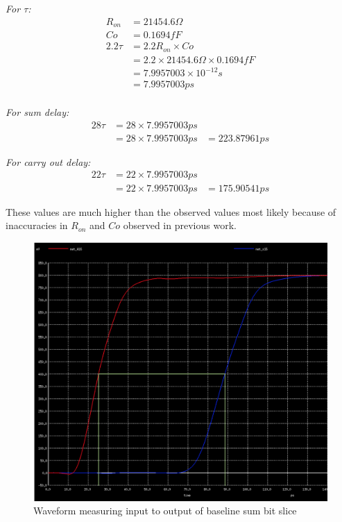 \documentclass{article}
\begin{document}
\textit{For $\tau$:}\\
\begin{align*}
R_{on} &= 21454.6\Omega\\
Co &= 0.1694fF\\
2.2 \tau &= 2.2 R_{on} \times Co\\
&= 2.2 \times 21454.6\Omega \times 0.1694fF \\
&= 7.9957003\times 10^{-12}s\\
&= 7.9957003ps\\
\end{align*}

\textit{For sum delay:}\\
\begin{align*}
28\tau &= 28 \times 7.9957003ps\\
&= 28 \times 7.9957003ps
&= 223.87961ps
\end{align*}

\textit{For carry out delay:}\\
\begin{align*}
22\tau &= 22 \times 7.9957003ps\\
&= 22 \times 7.9957003ps
&= 175.90541ps
\end{align*}

These values are much higher than the observed values most likely because of inaccuracies in $R_{on}$ and $Co$ observed in previous work. 

\begin{figure}[H]
  \includegraphics[width=\linewidth]{baseline_screenshots/sum_out_waveform.png}
  \caption{Waveform measuring input to output of baseline sum bit slice}
  \label{fig:sum_out_waveform}
\end{figure}
\end{document}
